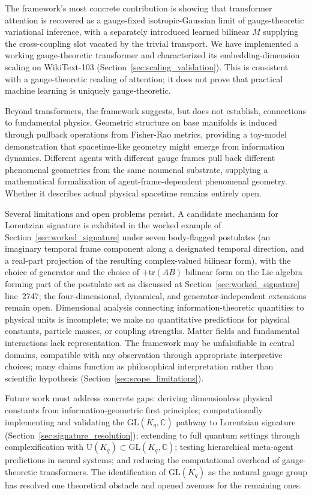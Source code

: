 \documentclass[11pt]{article}
\begin{document}
The framework's most concrete contribution is showing that transformer attention is recovered as a gauge-fixed isotropic-Gaussian limit of gauge-theoretic variational inference, with a separately introduced learned bilinear $M$ supplying the cross-coupling slot vacated by the trivial transport. We have implemented a working gauge-theoretic transformer and characterized its embedding-dimension scaling on WikiText-103 (Section~\ref{sec:scaling_validation}). This is consistent with a gauge-theoretic reading of attention; it does not prove that practical machine learning is uniquely gauge-theoretic.

Beyond transformers, the framework suggests, but does not establish, connections to fundamental physics. Geometric structure on base manifolds is induced through pullback operations from Fisher-Rao metrics, providing a toy-model demonstration that spacetime-like geometry might emerge from information dynamics. Different agents with different gauge frames pull back different phenomenal geometries from the same noumenal substrate, supplying a mathematical formalization of agent-frame-dependent phenomenal geometry. Whether it describes actual physical spacetime remains entirely open.

Several limitations and open problems persist. A candidate mechanism for Lorentzian signature is exhibited in the worked example of Section~\ref{sec:worked_signature} under seven body-flagged postulates (an imaginary temporal frame component along a designated temporal direction, and a real-part projection of the resulting complex-valued bilinear form), with the choice of generator and the choice of $+\mathrm{tr}(AB)$ bilinear form on the Lie algebra forming part of the postulate set as discussed at Section~\ref{sec:worked_signature} line~2747; the four-dimensional, dynamical, and generator-independent extensions remain open. Dimensional analysis connecting information-theoretic quantities to physical units is incomplete; we make no quantitative predictions for physical constants, particle masses, or coupling strengths. Matter fields and fundamental interactions lack representation. The framework may be unfalsifiable in central domains, compatible with any observation through appropriate interpretive choices; many claims function as philosophical interpretation rather than scientific hypothesis (Section~\ref{sec:scope_limitations}).

Future work must address concrete gaps: deriving dimensionless physical constants from information-geometric first principles; computationally implementing and validating the $\mathrm{GL}(K_q, \mathbb{C})$ pathway to Lorentzian signature (Section~\ref{sec:signature_resolution}); extending to full quantum settings through complexification with $\mathrm{U}(K_q) \subset \mathrm{GL}(K_q, \mathbb{C})$; testing hierarchical meta-agent predictions in neural systems; and reducing the computational overhead of gauge-theoretic transformers. The identification of $\mathrm{GL}(K_q)$ as the natural gauge group has resolved one theoretical obstacle and opened avenues for the remaining ones.
\end{document}
